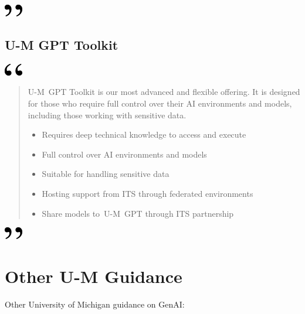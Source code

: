 \documentclass[
]{book}
\begin{document}
\includegraphics[width=0.3125in,height=0.20833in]{close.png}

\hypertarget{u-m-gpt-toolkit}{%
\subsection{U-M GPT Toolkit}\label{u-m-gpt-toolkit}}

\includegraphics[width=0.3125in,height=0.20833in]{open.png}

\begin{quote}
U-M~GPT Toolkit is our most advanced and flexible offering. It is designed for those who require full control over their AI environments and models, including those working with sensitive data.

\begin{itemize}
\item
  Requires deep technical knowledge to access and execute
\item
  Full control over AI environments and models
\item
  Suitable for handling sensitive data
\item
  Hosting support from ITS through federated environments
\item
  Share models to~U-M~GPT through ITS partnership
\end{itemize}
\end{quote}

\includegraphics[width=0.3125in,height=0.20833in]{close.png}

\hypertarget{other-u-m-guidance}{%
\section{Other U-M Guidance}\label{other-u-m-guidance}}

Other University of Michigan guidance on GenAI:
\end{document}
